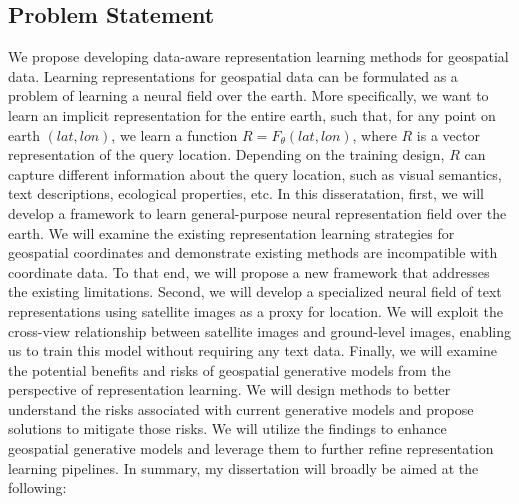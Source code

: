 


\subsection{Problem Statement}
We propose developing data-aware representation learning methods for geospatial data. Learning representations for geospatial data can be formulated as a problem of learning a neural field over the earth. More specifically, we want to learn an implicit representation for the entire earth, such that, for any point on earth $(lat,lon)$, we learn a function $R=F_\theta(lat,lon)$, where $R$ is a vector representation of the query location. Depending on the training design, $R$ can capture different information about the query location, such as visual semantics, text descriptions, ecological properties, etc. In this disseratation, first, we will develop a framework to learn general-purpose neural representation field over the earth. We will examine the existing representation learning strategies for geospatial coordinates and demonstrate existing methods are incompatible with coordinate data. To that end, we will propose a new framework that addresses the existing limitations. Second, we will develop a specialized neural field of text representations using satellite images as a proxy for location. We will exploit the cross-view relationship between satellite images and ground-level images, enabling us to train this model without requiring any text data.  Finally, we will examine the potential benefits and risks of geospatial generative models from the perspective of representation learning. We will design methods to better understand the risks associated with current generative models and propose solutions to mitigate those risks. We will utilize the findings to enhance geospatial generative models and leverage them to further refine representation learning pipelines. In summary, my dissertation will broadly be aimed at the following:
